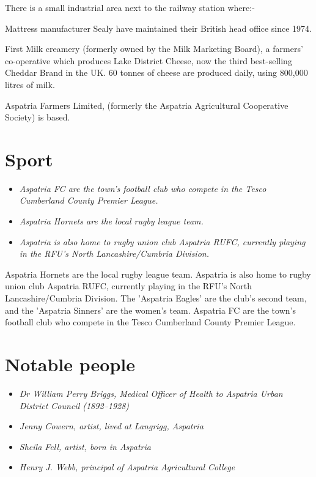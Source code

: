 There is a small industrial area next to the railway station where:-

Mattress manufacturer Sealy have maintained their British head office
since 1974.

First Milk creamery (formerly owned by the Milk Marketing Board), a
farmers' co-operative which produces Lake District Cheese, now the third
best-selling Cheddar Brand in the UK. 60 tonnes of cheese are produced
daily, using 800,000 litres of milk.

Aspatria Farmers Limited, (formerly the Aspatria Agricultural
Cooperative Society) is based.

\section{Sport}\label{sport}

\begin{itemize}
\item
  \emph{Aspatria FC are the town's football club who compete in the
  Tesco Cumberland County Premier League.}
\item
  \emph{Aspatria Hornets are the local rugby league team.}
\item
  \emph{Aspatria is also home to rugby union club Aspatria RUFC,
  currently playing in the RFU's North Lancashire/Cumbria Division.}
\end{itemize}

Aspatria Hornets are the local rugby league team. Aspatria is also home
to rugby union club Aspatria RUFC, currently playing in the RFU's North
Lancashire/Cumbria Division. The 'Aspatria Eagles' are the club's second
team, and the 'Aspatria Sinners' are the women's team. Aspatria FC are
the town's football club who compete in the Tesco Cumberland County
Premier League.

\section{Notable people}\label{notable-people}

\begin{itemize}
\item
  \emph{Dr William Perry Briggs, Medical Officer of Health to Aspatria
  Urban District Council (1892--1928)}
\item
  \emph{Jenny Cowern, artist, lived at Langrigg, Aspatria}
\item
  \emph{Sheila Fell, artist, born in Aspatria}
\item
  \emph{Henry J. Webb, principal of Aspatria Agricultural College}
\end{itemize}

